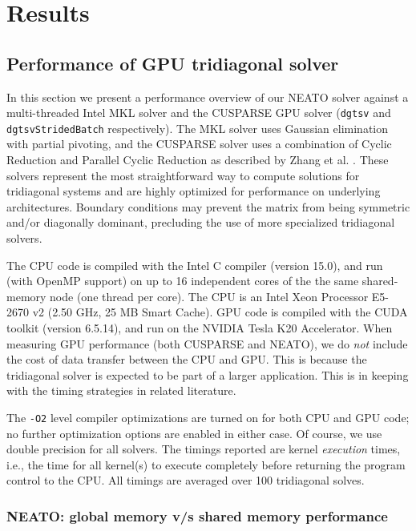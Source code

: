 \chapter{Results}

\section{Performance of GPU tridiagonal solver}

In this section we present a performance overview
of our NEATO solver
against a multi-threaded Intel MKL solver and
the CUSPARSE GPU solver
(\texttt{dgtsv} and \texttt{dgtsvStridedBatch} respectively).
The MKL solver uses Gaussian elimination with partial pivoting,
and the CUSPARSE solver uses a combination of
Cyclic Reduction and Parallel Cyclic Reduction
as described by Zhang et al. \cite{Zhang2010FTS}.
These solvers represent the most straightforward way
to compute solutions for tridiagonal systems
and are highly optimized for performance on
underlying architectures.
Boundary conditions may prevent
the matrix from being symmetric and/or diagonally dominant,
precluding the use of more specialized tridiagonal solvers.

The CPU code is compiled with the Intel C compiler (version 15.0),
and run (with OpenMP support) on up to
16 independent cores of the the same shared-memory node
(one thread per core).
The CPU is an
Intel Xeon Processor E5-2670 v2 (2.50 GHz, 25 MB Smart Cache).
GPU code is compiled with the CUDA toolkit (version 6.5.14),
and run on the
NVIDIA Tesla K20 Accelerator.
When measuring GPU performance (both CUSPARSE and NEATO),
we do \emph{not} include the cost
of data transfer between the CPU and GPU.
This is because the tridiagonal solver is expected to be
part of a larger application.
This is in keeping with the timing strategies
in related literature.

The \texttt{-O2} level compiler optimizations are turned on for both
CPU and GPU code;
no further optimization options are enabled in either case.
Of course, we use double precision for all solvers.
The timings reported are
kernel \emph{execution} times, i.e.,
the time for all kernel(s) to execute completely
before returning the program control to the CPU.
All timings are averaged over 100 tridiagonal solves.

\subsection{NEATO: global memory v/s shared memory performance}

